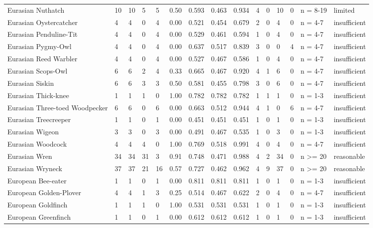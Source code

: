 \begin{landscape}
\begin{longtable}{L{3.6cm}*{12}{C{0.90cm}}L{1.45cm}L{1.65cm}}
Eurasian Nuthatch & 10 & 10 & 5 & 5 & 0.50 & 0.593 & 0.463 & 0.934 & 4 & 0 & 10 & 0 & n = 8-19 & limited \\
Eurasian Oystercatcher & 4 & 4 & 0 & 4 & 0.00 & 0.521 & 0.454 & 0.679 & 2 & 0 & 4 & 0 & n = 4-7 & insufficient \\
Eurasian Penduline-Tit & 4 & 4 & 0 & 4 & 0.00 & 0.529 & 0.461 & 0.594 & 1 & 0 & 4 & 0 & n = 4-7 & insufficient \\
Eurasian Pygmy-Owl & 4 & 4 & 0 & 4 & 0.00 & 0.637 & 0.517 & 0.839 & 3 & 0 & 0 & 4 & n = 4-7 & insufficient \\
Eurasian Reed Warbler & 4 & 4 & 0 & 4 & 0.00 & 0.527 & 0.467 & 0.586 & 1 & 0 & 4 & 0 & n = 4-7 & insufficient \\
Eurasian Scops-Owl & 6 & 6 & 2 & 4 & 0.33 & 0.665 & 0.467 & 0.920 & 4 & 1 & 6 & 0 & n = 4-7 & insufficient \\
Eurasian Siskin & 6 & 6 & 3 & 3 & 0.50 & 0.581 & 0.455 & 0.798 & 3 & 0 & 6 & 0 & n = 4-7 & insufficient \\
Eurasian Thick-knee & 1 & 1 & 1 & 0 & 1.00 & 0.782 & 0.782 & 0.782 & 1 & 1 & 1 & 0 & n = 1-3 & insufficient \\
Eurasian Three-toed Woodpecker & 6 & 6 & 0 & 6 & 0.00 & 0.663 & 0.512 & 0.944 & 4 & 1 & 0 & 6 & n = 4-7 & insufficient \\
Eurasian Treecreeper & 1 & 1 & 0 & 1 & 0.00 & 0.451 & 0.451 & 0.451 & 1 & 0 & 1 & 0 & n = 1-3 & insufficient \\
Eurasian Wigeon & 3 & 3 & 0 & 3 & 0.00 & 0.491 & 0.467 & 0.535 & 1 & 0 & 3 & 0 & n = 1-3 & insufficient \\
Eurasian Woodcock & 4 & 4 & 4 & 0 & 1.00 & 0.769 & 0.518 & 0.991 & 4 & 0 & 4 & 0 & n = 4-7 & insufficient \\
Eurasian Wren & 34 & 34 & 31 & 3 & 0.91 & 0.748 & 0.471 & 0.988 & 4 & 2 & 34 & 0 & n >= 20 & reasonable \\
Eurasian Wryneck & 37 & 37 & 21 & 16 & 0.57 & 0.727 & 0.462 & 0.962 & 4 & 9 & 37 & 0 & n >= 20 & reasonable \\
European Bee-eater & 1 & 1 & 0 & 1 & 0.00 & 0.811 & 0.811 & 0.811 & 1 & 0 & 1 & 0 & n = 1-3 & insufficient \\
European Golden-Plover & 4 & 4 & 1 & 3 & 0.25 & 0.514 & 0.467 & 0.622 & 2 & 0 & 4 & 0 & n = 4-7 & insufficient \\
European Goldfinch & 1 & 1 & 1 & 0 & 1.00 & 0.531 & 0.531 & 0.531 & 1 & 0 & 1 & 0 & n = 1-3 & insufficient \\
European Greenfinch & 1 & 1 & 0 & 1 & 0.00 & 0.612 & 0.612 & 0.612 & 1 & 0 & 1 & 0 & n = 1-3 & insufficient \\

\end{longtable}
\end{landscape}
